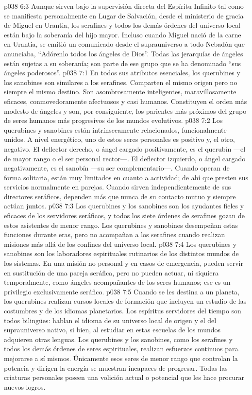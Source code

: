 \vs p038 6:3 Aunque sirven bajo la supervisión directa del Espíritu Infinito tal como se manifiesta personalmente en Lugar de Salvación, desde el ministerio de gracia de Miguel en Urantia, los serafines y todos los demás órdenes del universo local están bajo la soberanía del hijo mayor. Incluso cuando Miguel nació de la carne en Urantia, se emitió un comunicado desde el suprauniverso a todo Nebadón que anunciaba, “Adórenlo todos los ángeles de Dios”. Todas las jerarquías de ángeles están sujetas a su soberanía; son parte de ese grupo que se ha denominado “sus ángeles poderosos”.
\vs p038 7:1 En todos sus atributos esenciales, los querubines y los sanobines son similares a los serafines. Comparten el mismo origen pero no siempre el mismo destino. Son asombrosamente inteligentes, maravillosamente eficaces, conmovedoramente afectuosos y casi humanos. Constituyen el orden más modesto de ángeles y son, por consiguiente, los parientes más próximos del grupo de seres humanos más progresivos de los mundos evolutivos.
\vs p038 7:2 Los querubines y sanobines están intrínsecamente relacionados, funcionalmente unidos. A nivel energético, uno de estos seres personales es positivo y, el otro, negativo. El deflector derecho, o ángel cargado positivamente, es el querubín ---el de mayor rango o el ser personal rector---. El deflector izquierdo, o ángel cargado negativamente, es el sanobín ---su ser complementario---. Cuando operan de forma solitaria, están muy limitados en cuanto a actividad; de ahí que presten sus servicios normalmente en parejas. Cuando sirven independientemente de sus directores seráficos, dependen más que nunca de su contacto mutuo y siempre actúan juntos.
\vs p038 7:3 \pc Los querubines y los sanobines son los ayudantes fieles y eficaces de los servidores seráficos, y todos los siete órdenes de serafines gozan de estos asistentes de menor rango. Los querubines y sanobines desempeñan estas funciones durante eras, pero no acompañan a los serafines cuando realizan misiones más allá de los confines del universo local.
\vs p038 7:4 Los querubines y sanobines son los laboradores espirituales rutinarios de los distintos mundos de los sistemas. En una misión no personal y en casos de emergencia, pueden servir en sustitución de una pareja seráfica, pero no pueden actuar, ni siquiera temporalmente, como ángeles acompañantes de los seres humanos; ese es un privilegio exclusivamente seráfico.
\vs p038 7:5 \pc Cuando se les destina a un planeta, los querubines realizan cursos locales de formación que incluyen un estudio de las costumbres y de los idiomas planetarios. Los espíritus servidores del tiempo son todos bilingües: hablan el idioma de su universo local de origen y el del suprauniverso nativo, si bien, al estudiar en estas escuelas de los mundos adquieren otras lenguas. Los querubines y los sanobines, como los serafines y todos los demás órdenes de seres espirituales, realizan esfuerzos continuos para mejorarse a sí mismos. Únicamente esos seres de menor rango que controlan la potencia y dirigen la energía se muestran incapaces de progresar. Todas las criaturas personales poseen una volición actual o potencial que les hace procurar nuevos logros.
